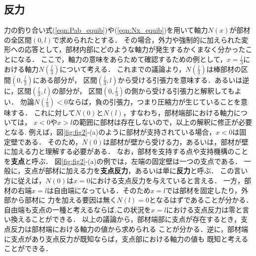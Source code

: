 \documentclass[11pt,a4j]{mybook2}
\begin{document}
\subsection{反力}
力の釣り合い式(\ref{eqn:Pab_equib})や(\ref{eqn:Nx_equib})を用いて軸力$N(x)$が部材の全区間$(0,l)$で求められたとする．
その場合，外力や強制的に加えられた変形への応答として，部材内部にどのような軸力が発生するかくまなく分かったことになる．
ここで，軸力の意味をあらためて確認するための例として，$x=\frac{l}{3}$における軸力$N(\frac{l}{3})$について考える．
これまでの議論より，$N(\frac{l}{3})$は棒部材の区間$(0,\frac{l}{3})$にある部分が，
区間$(\frac{l}{3},l)$から受ける引張力を意味する．あるいは逆に，区間$(\frac{l}{3},l)$の部分が，
区間$(0,\frac{l}{3})$の側から受ける引張力と解釈してもよい．
勿論$N(\frac{l}{3})<0$ならば，負の引張力，つまり圧縮力が生じていることを意味する．
これに対して$N(0)$と$N(l)$，すなわち，部材端部における軸力については，
$x<0$や$x>l$の範囲に部材は存在しないので，以上の解釈に修正が必要となる.
例えば，図\ref{fig:fig2}-(a)のように部材が支持されている場合，$x<0$は固定壁である．
そのため，$N(0)$は部材が壁から受ける力，あるいは，部材が壁に加える力と理解する必要がある．
なお，部材を支持する点や支持機構のことを{\rm \bf 支点}と呼ぶ．
図\ref{fig:fig2}-(a)の例では，左端の固定壁は一つの支点である．
一般に，支点が部材に加える力を{\bf 支点反力}，あるいは単に{\bf 反力}と呼ぶ．
この言い方に従えば，$N(0)$は$x=0$における支点反力を与えていると言える．
一方，部材の右端$x=l$は自由端になっている．そのため$x=l$では部材を固定したり，外部から部材に
力を加える要因は無く$N(l)=0$となるはずであることが分かる．
自由端も支点の一種と考えるならば,この状況を$x=l$における支点反力は零と言い換えることができる．
以上の議論から，部材端部に支点が存在するとき，支点反力は部材端における軸力の値から求められる
ことが分かる．逆に，部材端に支点があり支点反力が既知ならば，支点部における軸力の値も
既知と考えることができる．
\end{document}
